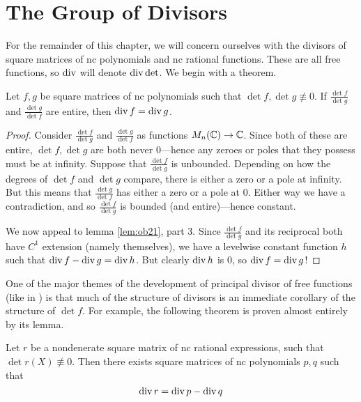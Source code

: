 \section{The Group of Divisors}%
\label{sec:divpoly}

For the remainder of this chapter, we will concern ourselves with the divisors
of square matrices of nc polynomials and nc rational functions. These are all
free functions, so \(\operatorname{div}\) will denote \(\operatorname{div} \det\). We begin with a
theorem.

\begin{theorem}
  Let \(f,g\) be square matrices of nc polynomials such that
  \(\det f, \det g \not\equiv 0\). If \(\frac{\det f}{\det g}\) and
  \(\frac{\det g}{\det f}\) are entire, then \(\operatorname{div} f = \operatorname{div} g\).
\end{theorem}

\begin{proof}
  Consider \(\frac{\det f}{\det g}\) and \(\frac{\det g}{\det f}\) as functions
  \(M_n(\mathbb{C})\to \mathbb{C} \). Since both of these are entire, \(\det f, \det g\) are
  both never 0---hence any zeroes or poles that they possess must be at
  infinity. Suppose that \(\frac{\det f}{\det g}\) is unbounded. Depending on how
  the degrees of \(\det f\) and \(\det g\) compare, there is either a zero or a
  pole at infinity. But this means that \(\frac{\det g}{\det f}\) has either a
  zero or a pole at \(0\). Either way we have a contradiction, and so
  \(\frac{\det f}{\det g}\) is bounded (and entire)---hence constant.

  We now appeal to lemma \ref{lem:ob21}, part 3. Since \(\frac{\det f}{\det g}\)
  and its reciprocal both have \(C^1\) extension (namely themselves), we have a
  levelwise constant function \(h\) such that \(\operatorname{div} f - \operatorname{div} g = \operatorname{div} h\).
  But clearly \(\operatorname{div} h\) is 0, so \(\operatorname{div} f = \operatorname{div} g\)!
\end{proof}

One of the major themes of the development of principal divisor of free
functions (like in \cite{pascoeFreeNoncommutativePrincipal2020}) is that much of
the structure of divisors is an immediate corollary of the structure of
\(\det f\). For example, the following theorem is proven almost entirely by its
lemma.

\begin{theorem}%
\label{thm:divop}
  Let \(r\) be a nondenerate square matrix of nc rational expressions, such that
  \(\det r(X) \not\equiv 0 \). Then there exists square matrices of nc
  polynomials \(p,q\)
  such that
  \[
    \operatorname{div} r = \operatorname{div} p - \operatorname{div} q
  \]
\end{theorem}

